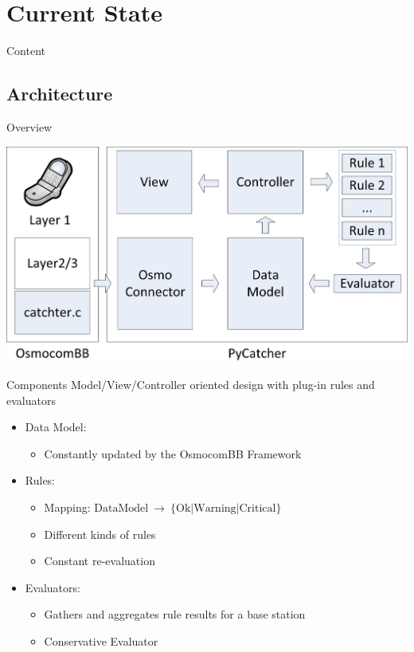 \documentclass{beamer}
\newcommand{\tocsection}[1]{
  \section{#1}
  \begin{frame}{Content}
    \tableofcontents[sectionstyle=show/shaded,subsectionstyle=show/show/hide]
  \end{frame}
 }
\begin{document}
\tocsection{Current State}
\subsection{Architecture}
\begin{frame}{Overview}
\begin{center}
	\includegraphics[width=\textwidth]{Architecture}
\end{center}

\end{frame}

\begin{frame}{Components}
Model/View/Controller oriented design with plug-in rules and evaluators
\begin{itemize}
	\item Data Model:
	\begin{itemize}
		\item Constantly updated by the OsmocomBB Framework
	\end{itemize}
	\item Rules:
	\begin{itemize}
		\item Mapping: $\text{DataModel}~\rightarrow~\{\text{Ok}\vert\text{Warning}\vert\text{Critical}\}$
		\item Different kinds of rules
		\item Constant re-evaluation
	\end{itemize}
	\item Evaluators:
	\begin{itemize}
		\item Gathers and aggregates rule results for a base station
		\item Conservative Evaluator
	\end{itemize}
\end{itemize}
\end{frame}
\end{document}
